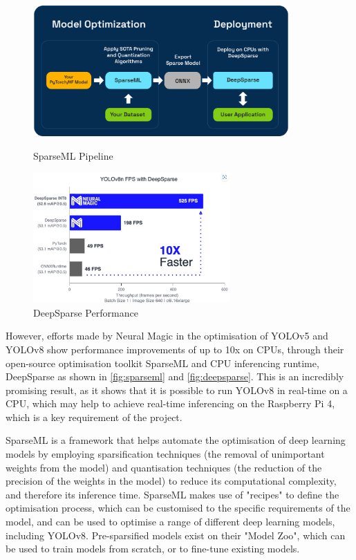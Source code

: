 \begin{figure}[H]
  \begin{minipage}[t]{0.49\textwidth}
    \centering
    \includegraphics[width=\textwidth,height=5cm]{imgs/articles/sparseml-workflow.png}
    \caption{SparseML Pipeline \cite{sparseml}}
    \label{fig:sparseml}
  \end{minipage}
  \hfill
  \begin{minipage}[t]{0.49\textwidth}
      \centering
      \includegraphics[width=\textwidth,height=5cm]{imgs/articles/yoloperf.jpg}
      \caption{DeepSparse Performance \cite{neuralmagic}}
      \label{fig:deepsparse}
      \end{minipage}
\end{figure}

However, efforts made by Neural Magic \cite{neuralmagic} in the optimisation of YOLOv5 and YOLOv8 show performance improvements of up to 10x on CPUs, through their open-source optimisation toolkit SparseML \cite{sparseml} and CPU inferencing runtime, DeepSparse \cite{deepsparse} as shown in \autoref{fig:sparseml} and \autoref{fig:deepsparse}. This is an incredibly promising result, as it shows that it is possible to run YOLOv8 in real-time on a CPU, which may help to achieve real-time inferencing on the Raspberry Pi 4, which is a key requirement of the project.

SparseML is a framework that helps automate the optimisation of deep learning models by employing sparsification techniques (the removal of unimportant weights from the model) and quantisation techniques (the reduction of the precision of the weights in the model) to reduce its computational complexity, and therefore its inference time. SparseML makes use of "recipes" to define the optimisation process, which can be customised to the specific requirements of the model, and can be used to optimise a range of different deep learning models, including YOLOv8. Pre-sparsified models exist on their "Model Zoo", which can be used to train models from scratch, or to fine-tune existing models.

